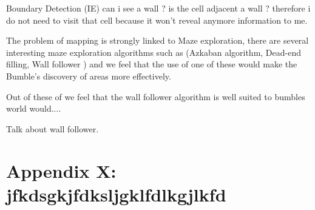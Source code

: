 \documentclass[a4paper,oneside]{report}
\begin{document}
		Boundary Detection (IE) can i see a wall ? is the cell adjacent a wall ? therefore i do not need to visit that cell because it won't reveal anymore information to me. 
	
		The problem of mapping is strongly linked to Maze exploration, there are several interesting maze exploration algorithms such as (Azkaban algorithm, Dead-end filling, Wall follower ) and we feel that the use of one of these would make the Bumble's discovery of areas more effectively. 
	
		Out of these of  we feel that the wall follower algorithm is well suited to bumbles world would.... 
		
		Talk about wall follower.

\appendix
\onehalfspace

\newpage
\section{Appendix X: jfkdsgkjfdksljgklfdlkgjlkfd}
\end{document}
